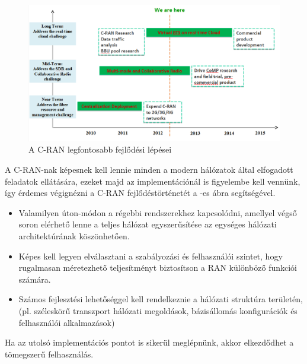 \hspace{2mm}
\begin{figure}[!ht]
\centering
\includegraphics[width=\textwidth, keepaspectratio]{figures/timeline.png}
\caption{A C-RAN legfontosabb fejlődési lépései} 
\label{fig:timeline}
\end{figure} 

\indent A C-RAN-nak képesnek kell lennie minden a modern hálózatok által elfogadott feladatok ellátására, ezeket majd az implementációnál is figyelembe kell vennünk, így érdemes végignézni a C-RAN fejlődéstörténetét a -es ábra segítségével.
\begin{itemize}
\item Valamilyen úton-módon a régebbi rendszerekhez kapcsolódni, amellyel végső soron elérhető lenne a teljes hálózat egyszerűsítése az egységes hálózati architektúrának köszönhetően.
\item Képes kell legyen elválasztani a szabályozási és felhasználói szintet, hogy rugalmasan méretezhető teljesítményt biztosítson a RAN különböző funkciói számára.
\item Számos fejlesztési lehetőséggel kell rendelkeznie a hálózati struktúra területén, (pl. széleskörű transzport hálózati megoldások, bázisállomás konfigurációk és felhasználói alkalmazások)
\end{itemize}
Ha az utolsó implementációs pontot is sikerül meglépnünk, akkor elkezdődhet a tömegszerű felhasználás.